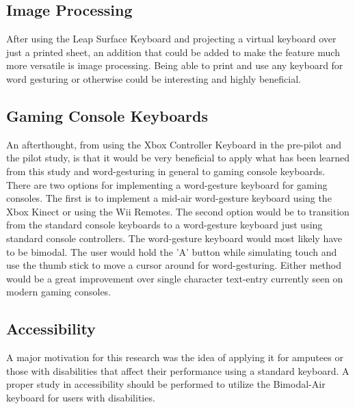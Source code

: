 \subsection{Image Processing}
After using the Leap Surface Keyboard and projecting a virtual keyboard over just a printed sheet, an addition that could be added to make the feature much more versatile is image processing. Being able to print and use any keyboard for word gesturing or otherwise could be interesting and highly beneficial.

\subsection{Gaming Console Keyboards} \label{future_gaming_keyboard}
An afterthought, from using the Xbox Controller Keyboard in the pre-pilot and the pilot study, is that it would be very beneficial to apply what has been learned from this study and word-gesturing in general to gaming console keyboards. There are two options for implementing a word-gesture keyboard for gaming consoles. The first is to implement a mid-air word-gesture keyboard using the Xbox Kinect or using the Wii Remotes. The second option would be to transition from the standard console keyboards to a word-gesture keyboard just using standard console controllers. The word-gesture keyboard would most likely have to be bimodal. The user would hold the 'A' button while simulating touch and use the thumb stick to move a cursor around for word-gesturing. Either method would be a great improvement over single character text-entry currently seen on modern gaming consoles.

\subsection{Accessibility}
A major motivation for this research was the idea of applying it for amputees or those with disabilities that affect their performance using a standard keyboard. A proper study in accessibility should be performed to utilize the Bimodal-Air keyboard for users with disabilities.

